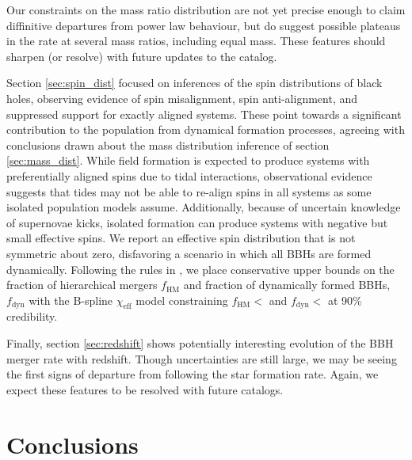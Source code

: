 Our constraints on the mass ratio distribution are not yet precise enough to claim diffinitive departures from power law behaviour, but do suggest possible plateaus in the rate at several mass ratios, including equal mass.  These features should sharpen (or resolve) with future updates to the catalog.

Section \ref{sec:spin_dist} focused on inferences of the spin distributions of black holes, observing evidence of spin misalignment, spin anti-alignment, and suppressed support 
for exactly aligned systems. These point towards a significant contribution to the population from dynamical formation processes, agreeing with 
conclusions drawn about the mass distribution inference of section \ref{sec:mass_dist}. While field formation is expected to produce systems with preferentially 
aligned spins due to tidal interactions, observational evidence suggests that tides may not be able to re-align spins in all systems as some 
isolated population models assume. Additionally, because of uncertain knowledge of supernovae kicks, isolated formation can produce systems with negative but small effective spins. 
We report an effective spin distribution that is not symmetric about zero, disfavoring a scenario in which all BBHs are formed dynamically. Following the rules in \citet{Fishbach_2022}, 
we place conservative upper bounds on the fraction of hierarchical mergers $f_\mathrm{HM}$ and fraction of dynamically formed BBHs, $f_\mathrm{dyn}$ with 
the B-spline $\chi_\mathrm{eff}$ model constraining $f_\mathrm{HM} < $\result{$\macros[ChiEffective][iid][frac_hm][10th percentile]$} 
and $f_\mathrm{dyn} < $ at 90\% credibility. 

Finally, section \ref{sec:redshift} shows potentially interesting evolution of the BBH merger rate with redshift.  Though uncertainties are still large, we may be seeing the first signs of departure from following the star formation rate.  Again, we expect these features to be resolved with future catalogs.

\section{Conclusions}\label{sec:conclusion}

